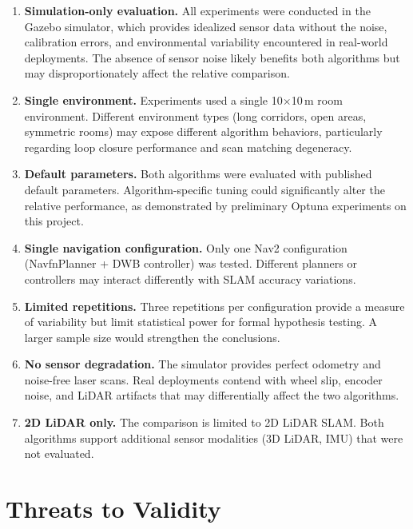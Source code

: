 \begin{enumerate}
\item \textbf{Simulation-only evaluation.} All experiments were conducted in the Gazebo simulator, which provides idealized sensor data without the noise, calibration errors, and environmental variability encountered in real-world deployments. The absence of sensor noise likely benefits both algorithms but may disproportionately affect the relative comparison.

\item \textbf{Single environment.} Experiments used a single 10$\times$10\,m room environment. Different environment types (long corridors, open areas, symmetric rooms) may expose different algorithm behaviors, particularly regarding loop closure performance and scan matching degeneracy.

\item \textbf{Default parameters.} Both algorithms were evaluated with published default parameters. Algorithm-specific tuning could significantly alter the relative performance, as demonstrated by preliminary Optuna experiments on this project.

\item \textbf{Single navigation configuration.} Only one Nav2 configuration (NavfnPlanner + DWB controller) was tested. Different planners or controllers may interact differently with SLAM accuracy variations.

\item \textbf{Limited repetitions.} Three repetitions per configuration provide a measure of variability but limit statistical power for formal hypothesis testing. A larger sample size would strengthen the conclusions.

\item \textbf{No sensor degradation.} The simulator provides perfect odometry and noise-free laser scans. Real deployments contend with wheel slip, encoder noise, and LiDAR artifacts that may differentially affect the two algorithms.

\item \textbf{2D LiDAR only.} The comparison is limited to 2D LiDAR SLAM. Both algorithms support additional sensor modalities (3D LiDAR, IMU) that were not evaluated.
\end{enumerate}

\section{Threats to Validity}

